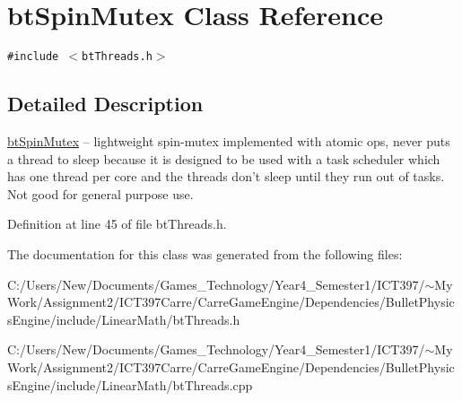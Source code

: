 \hypertarget{classbt_spin_mutex}{
\section{btSpinMutex Class Reference}
\label{classbt_spin_mutex}
}
{\tt \#include $<$btThreads.h$>$}



\subsection{Detailed Description}
\hyperlink{classbt_spin_mutex}{btSpinMutex} -- lightweight spin-mutex implemented with atomic ops, never puts a thread to sleep because it is designed to be used with a task scheduler which has one thread per core and the threads don't sleep until they run out of tasks. Not good for general purpose use. 

Definition at line 45 of file btThreads.h.

The documentation for this class was generated from the following files:\begin{CompactItemize}
\item 
C:/Users/New/Documents/Games\_\-Technology/Year4\_\-Semester1/ICT397/$\sim$My Work/Assignment2/ICT397Carre/CarreGameEngine/Dependencies/BulletPhysicsEngine/include/LinearMath/btThreads.h\item 
C:/Users/New/Documents/Games\_\-Technology/Year4\_\-Semester1/ICT397/$\sim$My Work/Assignment2/ICT397Carre/CarreGameEngine/Dependencies/BulletPhysicsEngine/include/LinearMath/btThreads.cpp\end{CompactItemize}
